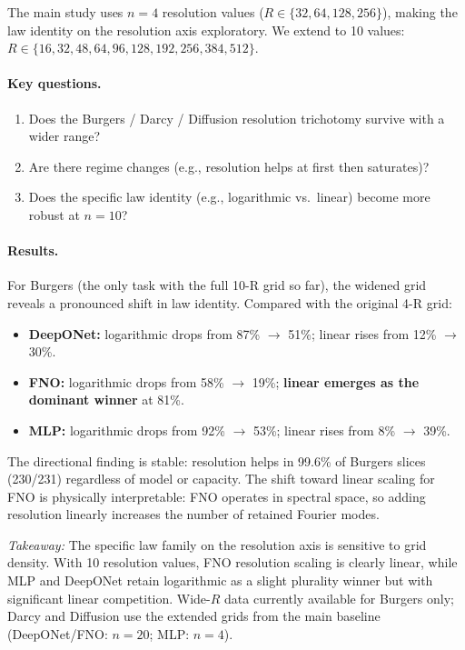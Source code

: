 \documentclass[11pt]{article}
\begin{document}
The main study uses $n = 4$ resolution values
($R \in \{32, 64, 128, 256\}$), making the law identity on the
resolution axis exploratory. We extend to 10 values:
$R \in \{16, 32, 48, 64, 96, 128, 192, 256, 384, 512\}$.

\paragraph{Key questions.}
\begin{enumerate}
  \item Does the Burgers / Darcy / Diffusion resolution trichotomy
    survive with a wider range?
  \item Are there regime changes (e.g., resolution helps at first then
    saturates)?
  \item Does the specific law identity (e.g., logarithmic vs.\ linear)
    become more robust at $n = 10$?
\end{enumerate}

\paragraph{Results.}
For Burgers (the only task with the full 10-R grid so far),
the widened grid reveals a pronounced shift in law identity.
Compared with the original 4-R grid:
\begin{itemize}
  \item \textbf{DeepONet:} logarithmic drops from 87\% $\to$ 51\%;
    linear rises from 12\% $\to$ 30\%.
  \item \textbf{FNO:} logarithmic drops from 58\% $\to$ 19\%;
    \textbf{linear emerges as the dominant winner} at 81\%.
  \item \textbf{MLP:} logarithmic drops from 92\% $\to$ 53\%;
    linear rises from 8\% $\to$ 39\%.
\end{itemize}
The directional finding is stable: resolution helps in 99.6\% of
Burgers slices (230/231) regardless of model or capacity.
The shift toward linear scaling for FNO is physically interpretable:
FNO operates in spectral space, so adding resolution linearly
increases the number of retained Fourier modes.

\emph{Takeaway:} The specific law family on the resolution axis
is sensitive to grid density. With 10 resolution values,
FNO resolution scaling is clearly linear, while MLP and DeepONet
retain logarithmic as a slight plurality winner but with significant
linear competition. Wide-$R$ data currently available for Burgers
only; Darcy and Diffusion use the extended grids from the main
baseline (DeepONet/FNO: $n = 20$; MLP: $n = 4$).
\end{document}
